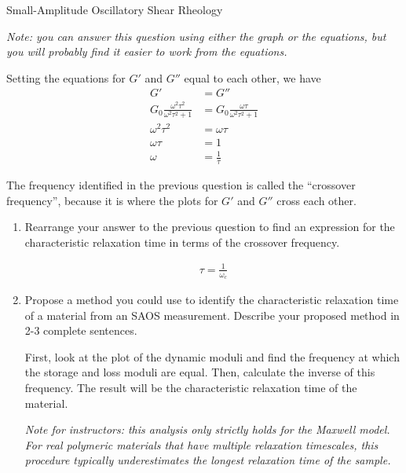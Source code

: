 \begin{activity}[extension]{Small-Amplitude Oscillatory Shear Rheology}
\begin{ctqs}
		\emph{Note: you can answer this question using either the graph or the equations, but you will probably find it easier to work from the equations.}
	
					\begin{solution}[1.75in]
					
						Setting the equations for $G'$ and $G''$ equal to each other, we have
						\begin{align*}
							G' &= G''\\
							G_0 \frac{\omega^2 \tau^2}{\omega^2 \tau^2 + 1} &= G_0 \frac{\omega \tau}{\omega^2 \tau^2 + 1}\\
							\omega^2 \tau^2 &= \omega \tau\\
							\omega\tau &= 1\\
							\omega &= \frac{1}{\tau}
						\end{align*}
					\end{solution}
	
	\question The frequency identified in the previous question is called the ``crossover frequency'', because it is where the plots for $G'$ and $G''$ cross each other.
	
		\begin{enumerate}
			\item Rearrange your answer to the previous question to find an expression for the characteristic relaxation time in terms of the crossover frequency.
	
					\begin{solution}[1in]
					
						\begin{align*}
							\tau = \frac{1}{\omega_c}
						\end{align*}
					\end{solution}
					
			\item Propose a method you could use to identify the characteristic relaxation time of a material from an SAOS measurement.  Describe your proposed method in 2-3 complete sentences.
			
				\begin{solution}[2.5in]
					First, look at the plot of the dynamic moduli and find the frequency at which the storage and loss moduli are equal.					
					Then, calculate the inverse of this frequency.  The result will be the characteristic relaxation time of the material.
					
					\emph{Note for instructors: this analysis only strictly holds for the Maxwell model.  For real polymeric materials that have multiple relaxation timescales, this procedure typically \emph{underestimates} the longest relaxation time of the sample.}
				\end{solution}
			

\end{enumerate}
\end{ctqs}
\end{activity}
